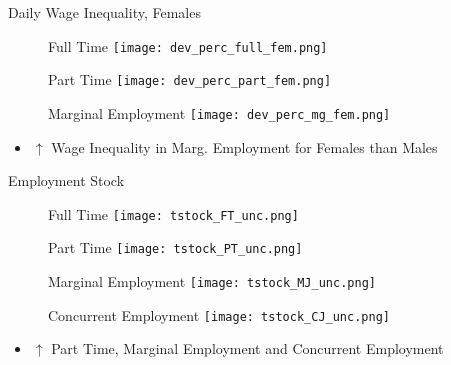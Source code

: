 \documentclass{beamer}
\let\oldcite=\cite
\renewcommand{\cite}[1]{\textcolor[rgb]{.0,.2,.7}{\oldcite{#1}}}
\begin{document}
\begin{frame}{Daily Wage Inequality, Females}
\begin{figure}[!t]
\centering
\begin{minipage}[b]{0.32\textwidth}{Full Time}
\centering
\texttt{[image: dev\_perc\_full\_fem.png]}
\end{minipage}
\begin{minipage}[b]{0.32\textwidth}{Part Time}
\centering
\texttt{[image: dev\_perc\_part\_fem.png]}
\end{minipage}
\begin{minipage}[b]{0.32\textwidth}{Marginal Employment}
\centering
\texttt{[image: dev\_perc\_mg\_fem.png]}
\end{minipage}
\end{figure}
\begin{itemize}
\setlength{\itemsep}{0.7 cm}
\item $\uparrow$ Wage Inequality in Marg. Employment for Females than Males
\end{itemize}
\end{frame}

\begin{frame}{Employment Stock}
\begin{figure}[!t]
\centering
\begin{minipage}[b]{0.4\textwidth}{Full Time}
\centering
\texttt{[image: tstock\_FT\_unc.png]}
\end{minipage}
\begin{minipage}[b]{0.4\textwidth}{Part Time}
\centering
\texttt{[image: tstock\_PT\_unc.png]}
\end{minipage}
\begin{minipage}[b]{0.4\textwidth}{Marginal Employment}
\centering
\texttt{[image: tstock\_MJ\_unc.png]}
\end{minipage}
\begin{minipage}[b]{0.4\textwidth}{Concurrent Employment}
\centering
\texttt{[image: tstock\_CJ\_unc.png]}
\end{minipage}
\end{figure}
\begin{itemize}
\setlength{\itemsep}{0.7 cm}
\item $\uparrow$ Part Time, Marginal Employment and Concurrent Employment \cite{CarriTuRo15} 
\end{itemize}
\end{frame}
\end{document}
